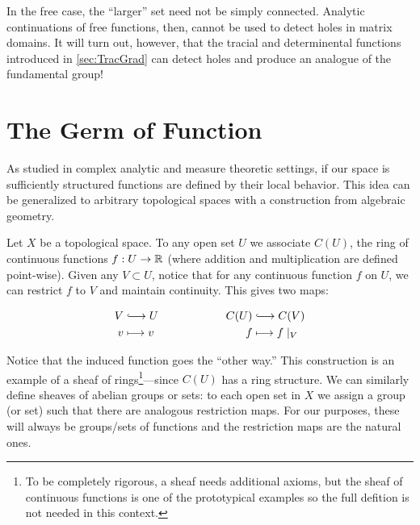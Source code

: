 In the free case, the ``larger'' set need not be simply connected. Analytic
continuations of free functions, then, cannot be used to detect holes in matrix
domains. It will turn out, however, that the tracial and determinental functions
introduced in \cref{sec:TracGrad} can detect holes and produce an analogue of
the fundamental group!

\section{The Germ of Function}%
\label{sec:germs}

As studied in complex analytic and measure theoretic settings, if our space is sufficiently
structured functions are defined by their local behavior. This idea can
be generalized to arbitrary topological spaces with a construction from
algebraic geometry.

Let \(X\) be a topological space. To any open set \(U\) we associate \(C(U)\),
the ring of continuous functions \(f: U \to \mathbb{R} \) (where addition and
multiplication are defined point-wise).
Given any \(V \subset U\), notice that for any continuous function \(f\) on \(U\), we
can restrict \(f\) to \(V\) and maintain continuity. This gives two maps:

\begin{equation*}
\begin{split}
	V &\lhook\joinrel\longrightarrow U \\
  v &\longmapsto v
\end{split} \qquad \qquad \qquad
\begin{split}
	C(U) &\lhook\joinrel\longrightarrow C(V) \\
  f &\longmapsto f \mid _V
\end{split}
\end{equation*}

Notice that the induced function goes the ``other way.'' This construction is an
example of a sheaf of rings\footnote{To be completely rigorous, a sheaf needs
  additional axioms, but the sheaf of continuous functions is one of the
  prototypical examples so the full defition is not needed in this
  context.}---since \(C(U)\) has a ring structure. We can similarly define sheaves
of abelian groups or sets: to each open set in \(X\) we assign a group (or set)
such that there are analogous restriction maps. For our purposes, these will
always be groups/sets of functions and the restriction maps are the natural ones.

